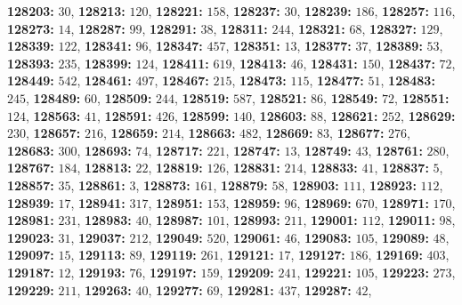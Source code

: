 \textsf{\bfseries 128203:} $30$, \textsf{\bfseries 128213:} $120$, \textsf{\bfseries 128221:} $158$, \textsf{\bfseries 128237:} $30$, \textsf{\bfseries 128239:} $186$, \textsf{\bfseries 128257:} $116$, \textsf{\bfseries 128273:} $14$, \textsf{\bfseries 128287:} $99$, \textsf{\bfseries 128291:} $38$, \textsf{\bfseries 128311:} $244$, \textsf{\bfseries 128321:} $68$, \textsf{\bfseries 128327:} $129$, \textsf{\bfseries 128339:} $122$, \textsf{\bfseries 128341:} $96$, \textsf{\bfseries 128347:} $457$, \textsf{\bfseries 128351:} $13$, \textsf{\bfseries 128377:} $37$, \textsf{\bfseries 128389:} $53$, \textsf{\bfseries 128393:} $235$, \textsf{\bfseries 128399:} $124$, \textsf{\bfseries 128411:} $619$, \textsf{\bfseries 128413:} $46$, \textsf{\bfseries 128431:} $150$, \textsf{\bfseries 128437:} $72$, \textsf{\bfseries 128449:} $542$, \textsf{\bfseries 128461:} $497$, \textsf{\bfseries 128467:} $215$, \textsf{\bfseries 128473:} $115$, \textsf{\bfseries 128477:} $51$, \textsf{\bfseries 128483:} $245$, \textsf{\bfseries 128489:} $60$, \textsf{\bfseries 128509:} $244$, \textsf{\bfseries 128519:} $587$, \textsf{\bfseries 128521:} $86$, \textsf{\bfseries 128549:} $72$, \textsf{\bfseries 128551:} $124$, \textsf{\bfseries 128563:} $41$, \textsf{\bfseries 128591:} $426$, \textsf{\bfseries 128599:} $140$, \textsf{\bfseries 128603:} $88$, \textsf{\bfseries 128621:} $252$, \textsf{\bfseries 128629:} $230$, \textsf{\bfseries 128657:} $216$, \textsf{\bfseries 128659:} $214$, \textsf{\bfseries 128663:} $482$, \textsf{\bfseries 128669:} $83$, \textsf{\bfseries 128677:} $276$, \textsf{\bfseries 128683:} $300$, \textsf{\bfseries 128693:} $74$, \textsf{\bfseries 128717:} $221$, \textsf{\bfseries 128747:} $13$, \textsf{\bfseries 128749:} $43$, \textsf{\bfseries 128761:} $280$, \textsf{\bfseries 128767:} $184$, \textsf{\bfseries 128813:} $22$, \textsf{\bfseries 128819:} $126$, \textsf{\bfseries 128831:} $214$, \textsf{\bfseries 128833:} $41$, \textsf{\bfseries 128837:} $5$, \textsf{\bfseries 128857:} $35$, \textsf{\bfseries 128861:} $3$, \textsf{\bfseries 128873:} $161$, \textsf{\bfseries 128879:} $58$, \textsf{\bfseries 128903:} $111$, \textsf{\bfseries 128923:} $112$, \textsf{\bfseries 128939:} $17$, \textsf{\bfseries 128941:} $317$, \textsf{\bfseries 128951:} $153$, \textsf{\bfseries 128959:} $96$, \textsf{\bfseries 128969:} $670$, \textsf{\bfseries 128971:} $170$, \textsf{\bfseries 128981:} $231$, \textsf{\bfseries 128983:} $40$, \textsf{\bfseries 128987:} $101$, \textsf{\bfseries 128993:} $211$, \textsf{\bfseries 129001:} $112$, \textsf{\bfseries 129011:} $98$, \textsf{\bfseries 129023:} $31$, \textsf{\bfseries 129037:} $212$, \textsf{\bfseries 129049:} $520$, \textsf{\bfseries 129061:} $46$, \textsf{\bfseries 129083:} $105$, \textsf{\bfseries 129089:} $48$, \textsf{\bfseries 129097:} $15$, \textsf{\bfseries 129113:} $89$, \textsf{\bfseries 129119:} $261$, \textsf{\bfseries 129121:} $17$, \textsf{\bfseries 129127:} $186$, \textsf{\bfseries 129169:} $403$, \textsf{\bfseries 129187:} $12$, \textsf{\bfseries 129193:} $76$, \textsf{\bfseries 129197:} $159$, \textsf{\bfseries 129209:} $241$, \textsf{\bfseries 129221:} $105$, \textsf{\bfseries 129223:} $273$, \textsf{\bfseries 129229:} $211$, \textsf{\bfseries 129263:} $40$, \textsf{\bfseries 129277:} $69$, \textsf{\bfseries 129281:} $437$, \textsf{\bfseries 129287:} $42$, 
